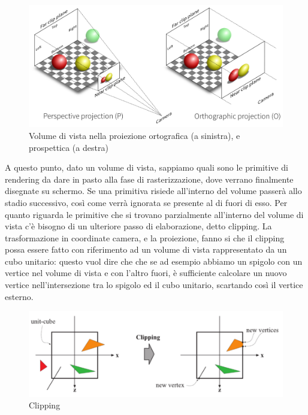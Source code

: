 \begin{figure}[htb]
 \centering
 \includegraphics[width=1.0\linewidth]{images/chapter_stato_arte/stato_arte_projections.png}\hfill
 \caption[Proiezione prospettica ed ortogonale]{Volume di vista nella proiezione ortografica (a sinistra), e prospettica (a destra)}
 \label{fig:stato_arte_trasfvista}
\end{figure}

A questo punto, dato un volume di vista, sappiamo quali sono le primitive di rendering da dare in pasto alla fase di rasterizzazione, dove verrano finalmente disegnate su schermo.
Se una primitiva risiede all’interno del volume passerà allo stadio successivo, così come verrà ignorata se presente al di fuori di esso. Per quanto riguarda le primitive che si trovano parzialmente all’interno del volume di vista c’è bisogno di un ulteriore passo di elaborazione, detto clipping. La trasformazione in coordinate camera, e la proiezione, fanno si che il clipping possa essere fatto con riferimento ad un volume di vista rappresentato da un cubo unitario: questo vuol dire che che se ad esempio abbiamo un spigolo con un vertice nel volume di vista e con l’altro fuori, è sufficiente calcolare un nuovo vertice nell’intersezione tra lo spigolo ed il cubo unitario, scartando così il vertice esterno.\\

\begin{figure}[htb]
 \centering
 \includegraphics[width=1.0\linewidth]{images/chapter_stato_arte/stato_arte_clipping.png}\hfill
 \caption[Clipping]{Clipping}
 \label{fig:stato_arte_clipping}
\end{figure}

